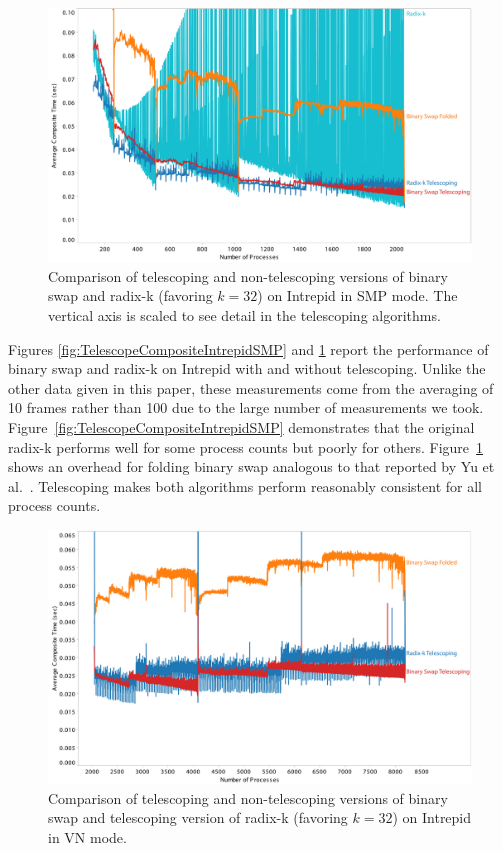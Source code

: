 \documentclass{acm_proc_article-sp}
\newcommand*{\scite}[1]{~\cite{#1}}
\newcommand{\etal}{et al.}
\begin{document}
\begin{figure}[tbp]
  \centering
  \includegraphics[width=\linewidth]{images/TelescopeCompositeIntrepidSMPZoomed}
  \caption{Comparison of telescoping and non-telescoping versions of binary
    swap and radix-k (favoring $k=32$) on Intrepid in SMP mode.  The
    vertical axis is scaled to see detail in the telescoping algorithms.}
  \label{fig:TelescopeCompositeIntrepidSMPZoomed}
\end{figure}

Figures \ref{fig:TelescopeCompositeIntrepidSMP} and
\ref{fig:TelescopeCompositeIntrepidSMPZoomed} report the performance of
binary swap and radix-k on Intrepid with and without telescoping.  Unlike
the other data given in this paper, these measurements come from the
averaging of 10 frames rather than 100 due to the large number of
measurements we took.  Figure~\ref{fig:TelescopeCompositeIntrepidSMP}
demonstrates that the original radix-k performs well for some process
counts but poorly for others.
Figure~\ref{fig:TelescopeCompositeIntrepidSMPZoomed} shows an overhead for
folding binary swap analogous to that reported by Yu \etal\scite{23Swap}.
Telescoping makes both algorithms perform reasonably consistent for all
process counts.

\begin{figure}[tbp]
  \centering
  \includegraphics[width=\linewidth]{images/TelescopeCompositeIntrepidVN}
  \caption{Comparison of telescoping and non-telescoping versions of binary
    swap and telescoping version of radix-k (favoring $k=32$) on Intrepid
    in VN mode.}
  \label{fig:TelescopeCompositeIntrepidVN}
\end{figure}
\end{document}

